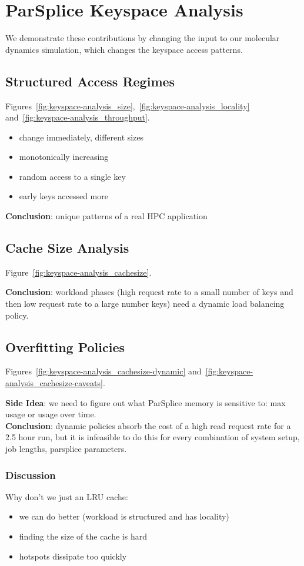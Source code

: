 \section{ParSplice Keyspace Analysis}



We demonstrate these contributions by changing the input to our molecular
dynamics simulation, which changes the keyspace access patterns. 

\subsection{Structured Access Regimes}

Figures~\ref{fig:keyspace-analysis_size},~\ref{fig:keyspace-analysis_locality} and~\ref{fig:keyspace-analysis_throughput}.
\begin{itemize}
  \item change immediately, different sizes
  \item monotonically increasing
  \item random access to a single key
  \item early keys accessed more
\end{itemize}

\noindent\textbf{Conclusion}: unique patterns of a real HPC application

\subsection{Cache Size Analysis}

Figure~\ref{fig:keyspace-analysis_cachesize}.

\noindent\textbf{Conclusion}: workload phases (high request rate to a small
number of keys and then low request rate to a large number keys) need a dynamic
load balancing policy.

\subsection{Overfitting Policies}

Figures~\ref{fig:keyspace-analysis_cachesize-dynamic} and~\ref{fig:keyspace-analysis_cachesize-caveats}.

\noindent\textbf{Side Idea}: we need to figure out what ParSplice memory is
sensitive to: max usage or usage over time.\\

\noindent\textbf{Conclusion}: dynamic policies absorb the cost of a high read
request rate for a 2.5 hour run, but it is infeasible to do this for every
combination of system setup, job lengths, parsplice parameters.

\subsubsection*{Discussion}
Why don't we just an LRU cache:
\begin{itemize}
  \item we can do better (workload is structured and has locality)
  \item finding the size of the cache is hard
  \item hotspots dissipate too quickly
\end{itemize}
